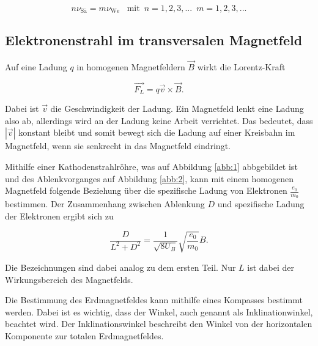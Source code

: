 \begin{equation}
  n \nu_\text{Sä} = m \nu_\text{We} \,\,\,\,\, \text{mit} \, \, \, n=1, 2, 3, ... \, \, \, m=1, 2, 3, ...
  \label{eq:2}
\end{equation}


\subsection{Elektronenstrahl im transversalen Magnetfeld}

Auf eine Ladung $q$ in homogenen Magnetfeldern $\vec{B}$ wirkt die Lorentz-Kraft

\begin{equation*}
  \vec{F_L} = q \vec{v} \times \vec{B}.
\end{equation*}

Dabei ist $\vec{v}$ die Geschwindigkeit der Ladung. Ein Magnetfeld lenkt eine Ladung
also ab, allerdings wird an der Ladung keine Arbeit verrichtet. Das bedeutet, dass
$|\vec{v}|$ konstant bleibt und somit bewegt sich die Ladung auf einer Kreisbahn im Magnetfeld,
wenn sie senkrecht in das Magnetfeld eindringt.

Mithilfe einer Kathodenstrahlröhre, was auf Abbildung \ref{abb:1} abbgebildet ist und des
Ablenkvorganges auf Abbildung \ref{abb:2}, kann mit einem homogenen Magnetfeld
folgende Beziehung über die spezifische Ladung von Elektronen $\frac{e_0}{m_0}$ bestimmen.
Der Zusammenhang zwischen Ablenkung $D$ und spezifische Ladung der Elektronen ergibt sich zu

\begin{equation}
  \frac{D}{L^2 + D^2} = \frac{1}{\sqrt{8 U_B}} \sqrt{\frac{e_0}{m_0}} B.
  \label{eq:3}
\end{equation}

Die Bezeichnungen sind dabei analog zu dem ersten Teil. Nur $L$ ist dabei der
Wirkungsbereich des Magnetfelds.

Die Bestimmung des Erdmagnetfeldes kann mithilfe eines Kompasses bestimmt werden.
Dabei ist es wichtig, dass der Winkel, auch genannt als Inklinationwinkel, beachtet wird.
Der Inklinationswinkel beschreibt den Winkel von der horizontalen Komponente zur
totalen Erdmagnetfeldes. 
